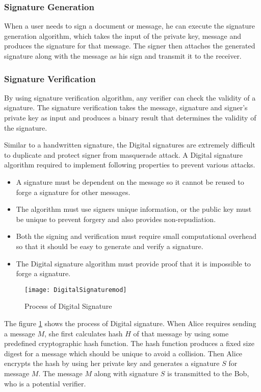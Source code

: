 \subsubsection{Signature Generation} 
When a user needs to sign a document or message, he can execute the signature generation algorithm, which takes the input of the private key, message and produces the signature for that message. The signer then attaches the generated signature along with the message as his sign and transmit it to the receiver.
\subsubsection{Signature Verification} 
By using signature verification algorithm, any verifier can check the validity of a signature. The signature verification takes the message, signature and signer's private key as input and produces a binary result that determines the validity of the signature.
 
Similar to a handwritten signature, the Digital signatures are extremely difficult to duplicate and protect signer from masquerade attack. A Digital signature algorithm required to implement following properties to prevent various attacks.
\begin{itemize}
\item A signature must be dependent on the message so it cannot be reused to forge a signature for other messages.
\item The algorithm must use signers unique information, or the public key must be unique to prevent forgery and also provides non-repudiation.
\item Both the signing and verification must require small computational overhead so that it should be easy to generate and verify a signature.
\item The Digital signature algorithm must provide proof that it is impossible to forge a signature.
\end{itemize} 

 \begin{figure}[h]
    \centering
    \texttt{[image: DigitalSignaturemod]}
    \caption{Process of Digital Signature }
    \label{fig:Digital Signature}
\end{figure}

The figure \ref{fig:Digital Signature} shows the process of Digital signature. When Alice requires sending a message $M$, she first calculates hash $H$ of that message by using some predefined cryptographic hash function. The hash function produces a fixed size digest for a message which should be unique to avoid a collision. Then Alice encrypts the hash by using her private key and generates a signature $S$ for message $M$. The message $M$ along with signature $S$ is transmitted to the Bob, who is a potential verifier.

